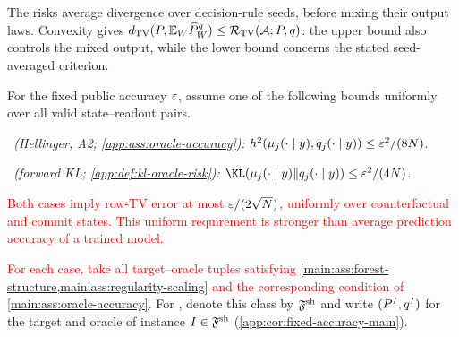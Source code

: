 The risks average divergence over decision-rule seeds, before mixing their
output laws. Convexity gives
$\dTV(\TargetLaw,\mathbb E_{\ControllerSeed}
 \SamplerOutputLaw{\ControllerSeed}{\FrozenOracle})
 \le\SeedRisk(\mathcal A;\TargetLaw,\FrozenOracle)$:
the upper bound also controls the mixed output, while the lower bound
concerns the stated seed-averaged criterion.

\begin{assumption}
\label{main:ass:oracle-accuracy}
For the fixed public accuracy $\TargetTolerance$, assume one of the
following bounds uniformly over all valid state--readout pairs.

\emph{\HellingerCaseTitle\ (Hellinger, A2; \cref{app:ass:oracle-accuracy}):}
$\sqHellinger(\ExactRow{y}{j},\OracleRow{y}{j})
 \le\TargetTolerance^2/(8N)$.

\emph{\KLCaseTitle\ (forward KL; \cref{app:def:kl-oracle-risk}):}
$\KLDivergence{\ExactRow{y}{j}}{\OracleRow{y}{j}}
 \le\TargetTolerance^2/(4N)$.
\end{assumption}
\textcolor{red}{Both cases imply row-TV error at most
$\TargetTolerance/(2\sqrt N)$, uniformly over counterfactual and commit states.
This uniform requirement is stronger than average prediction accuracy
of a trained model.}

\begin{definition}
\label{main:def:shared-rate-class}
\textcolor{red}{For each case, take all target--oracle tuples satisfying
\cref{main:ass:forest-structure,main:ass:regularity-scaling}
and the corresponding condition of \cref{main:ass:oracle-accuracy}.}
For \HellingerCase, denote this class by $\SharedClass$ and write
$(\InstanceTargetLaw{I},\InstanceOracle{I})$ for the target and oracle of
instance $I\in\SharedClass$ (\cref{app:cor:fixed-accuracy-main}).
\end{definition}
